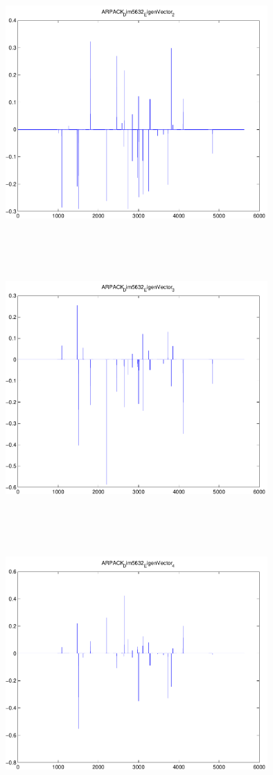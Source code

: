 \documentclass[9pt]{article}
\theoremstyle{plain}
\theoremstyle{definition}
\theoremstyle{remark}
\numberwithin{equation}{section}
\begin{document}
\includegraphics[width=10.0cm,height=10.0cm]{ARPACK_Dim5632_EigenVector_2.pdf}

\includegraphics[width=10.0cm,height=10.0cm]{ARPACK_Dim5632_EigenVector_3.pdf}

\includegraphics[width=10.0cm,height=10.0cm]{ARPACK_Dim5632_EigenVector_4.pdf}
\end{document}
